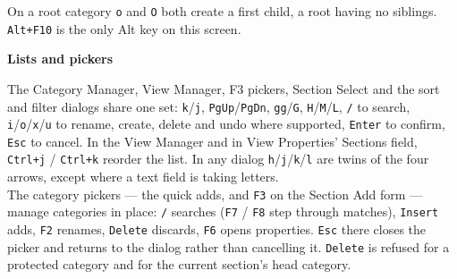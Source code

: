 \documentclass[10pt]{article}
\newcommand{\key}[1]{\texttt{#1}}
\newcommand{\heading}[1]{\par\vspace{5pt}\textbf{#1}\par\vspace{3pt}}
\begin{document}
On a root category \key{o} and \key{O} both create a first child, a root having
no siblings. \key{Alt+F10} is the only Alt key on this screen.

\heading{Lists and pickers}
The Category Manager, View Manager, F3 pickers, Section Select and the sort and
filter dialogs share one set: \key{k}/\key{j}, \key{PgUp}/\key{PgDn},
\key{gg}/\key{G}, \key{H}/\key{M}/\key{L}, \key{/} to search,
\key{i}/\key{o}/\key{x}/\key{u} to rename, create, delete and undo where
supported, \key{Enter} to confirm, \key{Esc} to cancel. In the View Manager and
in View Properties' Sections field, \key{Ctrl+j} / \key{Ctrl+k} reorder the
list. In any dialog \key{h}/\key{j}/\key{k}/\key{l} are twins of the four
arrows, except where a text field is taking letters.\\[3pt]
The category pickers --- the quick adds, and \key{F3} on the Section Add form
--- manage categories in place: \key{/} searches (\key{F7} / \key{F8} step through
matches), \key{Insert} adds, \key{F2} renames, \key{Delete} discards, \key{F6}
opens properties. \key{Esc} there closes the picker and returns to the dialog
rather than cancelling it. \key{Delete} is refused for a protected category and
for the current section's head category.
\end{document}
